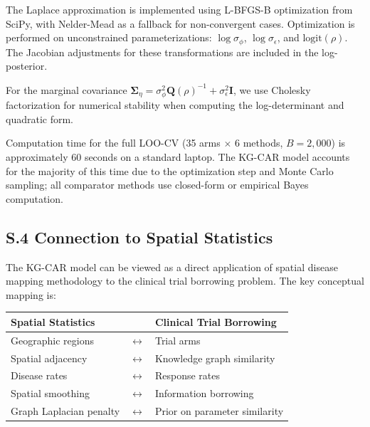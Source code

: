 \documentclass[12pt]{article}
\newcommand{\bI}{\mathbf{I}}
\newcommand{\bQ}{\mathbf{Q}}
\begin{document}
The Laplace approximation is implemented using L-BFGS-B optimization from SciPy, with Nelder-Mead as a fallback for non-convergent cases. Optimization is performed on unconstrained parameterizations: $\log \sigma_\phi$, $\log \sigma_\epsilon$, and $\text{logit}(\rho)$. The Jacobian adjustments for these transformations are included in the log-posterior.

For the marginal covariance $\boldsymbol{\Sigma}_\eta = \sigma_\phi^2 \bQ(\rho)^{-1} + \sigma_\epsilon^2 \bI$, we use Cholesky factorization for numerical stability when computing the log-determinant and quadratic form.

Computation time for the full LOO-CV (35 arms $\times$ 6 methods, $B = 2{,}000$) is approximately 60 seconds on a standard laptop. The KG-CAR model accounts for the majority of this time due to the optimization step and Monte Carlo sampling; all comparator methods use closed-form or empirical Bayes computation.

\subsection*{S.4 Connection to Spatial Statistics}

The KG-CAR model can be viewed as a direct application of spatial disease mapping methodology \citep{besag1991bayesian, leroux2000estimation, rue2005gaussian} to the clinical trial borrowing problem. The key conceptual mapping is:

\begin{center}
\begin{tabular}{lll}
\toprule
Spatial Statistics & & Clinical Trial Borrowing \\
\midrule
Geographic regions & $\longleftrightarrow$ & Trial arms \\
Spatial adjacency & $\longleftrightarrow$ & Knowledge graph similarity \\
Disease rates & $\longleftrightarrow$ & Response rates \\
Spatial smoothing & $\longleftrightarrow$ & Information borrowing \\
Graph Laplacian penalty & $\longleftrightarrow$ & Prior on parameter similarity \\
\bottomrule
\end{tabular}
\end{center}
\end{document}
